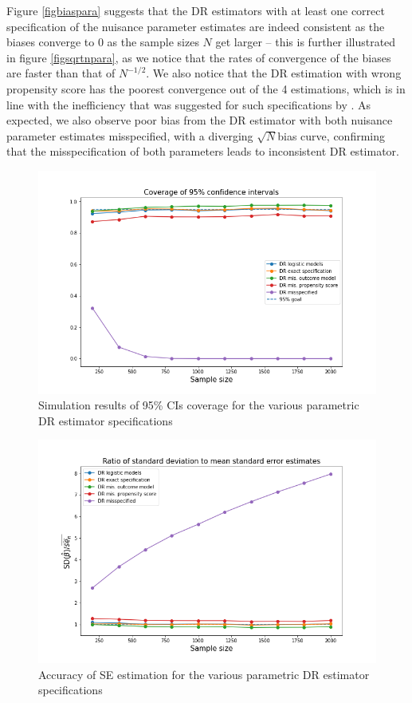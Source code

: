 \documentclass[12pt,twoside]{article}
\begin{document}
Figure \ref{figbiaspara} suggests that the DR estimators with at least one correct specification of the nuisance parameter estimates are indeed consistent as the biases converge to 0 as the sample sizes $N$ get larger -- this is further illustrated in figure \ref{figsqrtnpara}, as we notice that the rates of convergence of the biases are faster than that of $N^{-1/2}$. We also notice that the DR estimation with wrong propensity score has the poorest convergence out of the 4 estimations, which is in line with the inefficiency that was suggested for such specifications by \citet{kang}. As expected, we also observe poor bias from the DR estimator with both nuisance parameter estimates misspecified, with a diverging $\sqrt{N}$bias curve, confirming that the misspecification of both parameters leads to inconsistent DR estimator.

\begin{figure}[h!]
    \centering
    \includegraphics[width = 0.9\columnwidth]{figures/CIpara.png}
    \caption{Simulation results of 95\% CIs coverage for the various parametric DR estimator specifications}
    \label{figCIpara}
\end{figure}

\begin{figure}[h!]
    \centering
    \includegraphics[width = 0.9\columnwidth]{figures/SEpara.png}
    \caption{Accuracy of \citet{lunceford_davidian} SE estimation for the various parametric DR estimator specifications}
    \label{figSEpara}
\end{figure}
\end{document}
